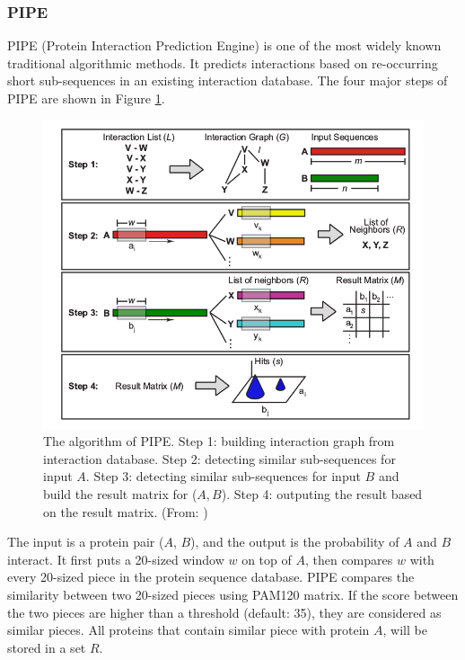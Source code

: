 \subsubsection{PIPE}
PIPE (Protein Interaction Prediction Engine)\cite{Pitre06_PIPE} is one of the most widely known traditional algorithmic methods. It predicts interactions based on re-occurring short sub-sequences in an existing interaction database. The  four major steps of PIPE are shown in Figure \ref{fig_PIPE}.
\begin{figure}[h!]
\begin{center}
\includegraphics[height =13 cm]{img/PIPE_procedure.png}
\caption[The algorithm of PIPE]{The algorithm of PIPE. Step 1: building interaction graph from interaction database. Step 2: detecting similar sub-sequences for input $A$. Step 3: detecting similar sub-sequences for input $B$ and build the result matrix for ($A, B$). Step 4: outputing the result based on the result matrix. (From: \cite{Pitre06_PIPE} ) \label{fig_PIPE}}
\end{center}
\end{figure}
The input is a protein pair ($A$, $B$), and the output is the probability of $A$ and $B$ interact. It first puts a 20-sized window $w$ on top of $A$, then compares $w$ with every 20-sized piece in the protein sequence database. PIPE compares the similarity between two 20-sized pieces using PAM120 matrix. If the score between the two pieces are higher than a threshold (default: 35), they are considered as similar pieces. All proteins that contain similar piece with protein $A$, will be stored in a set $R$. 

